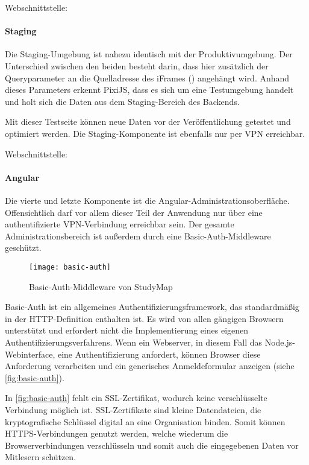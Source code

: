 \noindent
Webschnittstelle: 

\paragraph*{Staging}
Die Staging-Umgebung ist nahezu identisch mit der Produktivumgebung. Der Unterschied zwischen den beiden besteht darin, dass hier zusätzlich der Queryparameter  an die Quelladresse des iFrames () angehängt wird. Anhand dieses Parameters erkennt PixiJS, dass es sich um eine Testumgebung handelt und holt sich die Daten aus dem Staging-Bereich des Backends.

Mit dieser Testseite können neue Daten vor der Veröffentlichung getestet und optimiert werden. Die Staging-Komponente ist ebenfalls nur per VPN erreichbar.

\noindent
Webschnittstelle: 

\paragraph*{Angular}\label{paragraph:angular-basic-auth}
Die vierte und letzte Komponente ist die Angular-Administrationsoberfläche. Offensichtlich darf vor allem dieser Teil der Anwendung nur über eine authentifizierte VPN-Verbindung erreichbar sein. Der gesamte Administrationsbereich ist außerdem durch eine Basic-Auth-Middleware geschützt.

\begin{figure}[H]
    \centering
    \texttt{[image: basic-auth]}
    \caption{Basic-Auth-Middleware von StudyMap}
    \label{fig:basic-auth}
\end{figure}

Basic-Auth ist ein allgemeines Authentifizierungsframework, das standardmäßig in der HTTP-Definition enthalten ist. \parencite{mozilla_corporation_http_2023} Es wird von allen gängigen Browsern unterstützt und erfordert nicht die Implementierung eines eigenen Authentifizierungsverfahrens. \parencite{fyrd_headers_2024} Wenn ein Webserver, in diesem Fall das Node.js-Webinterface, eine Authentifizierung anfordert, können Browser diese Anforderung verarbeiten und ein generisches Anmeldeformular anzeigen (siehe \autoref{fig:basic-auth}).

In \autoref{fig:basic-auth} fehlt ein SSL-Zertifikat, wodurch keine verschlüsselte Verbindung möglich ist. SSL-Zertifikate sind kleine Datendateien, die kryptografische Schlüssel digital an eine Organisation binden. Somit können HTTPS-Verbindungen genutzt werden, welche wiederum die Browserverbindungen verschlüsseln und somit auch die eingegebenen Daten vor Mitlesern schützen. \parencite{globalsign_was_2023}


